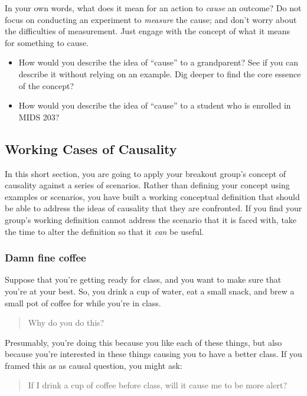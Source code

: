 \documentclass[
]{article}
\providecommand{\tightlist}{%
  \setlength{\itemsep}{0pt}\setlength{\parskip}{0pt}}
\theoremstyle{definition}
\theoremstyle{definition}
\theoremstyle{definition}
\theoremstyle{definition}
\theoremstyle{remark}
\begin{document}
In your own words, what does it mean for an action to \emph{cause} an outcome? Do not focus on conducting an experiment to \emph{measure} the cause; and don't worry about the difficulties of measurement. Just engage with the concept of what it means for something to cause.

\begin{itemize}
\tightlist
\item
  How would you describe the idea of ``cause'' to a grandparent? See if you can describe it without relying on an example. Dig deeper to find the core essence of the concept?
\item
  How would you describe the idea of ``cause'' to a student who is enrolled in MIDS 203?
\end{itemize}

\subsection{Working Cases of Causality}\label{working-cases-of-causality}

In this short section, you are going to apply your breakout group's concept of causality against a series of scenarios. Rather than defining your concept using examples or scenarios, you have built a working conceptual definition that should be able to address the ideas of causality that they are confronted. If you find your group's working definition cannot address the scenario that it is faced with, take the time to alter the definition so that it \emph{can} be useful.

\subsubsection{Damn fine coffee}\label{damn-fine-coffee}

Suppose that you're getting ready for class, and you want to make sure that you're at your best. So, you drink a cup of water, eat a small snack, and brew a small pot of coffee for while you're in class.

\begin{quote}
Why do you do this?
\end{quote}

Presumably, you're doing this because you like each of these things, but also because you're interested in these things causing you to have a better class. If you framed this as as causal question, you might ask:

\begin{quote}
If I drink a cup of coffee before class, will it cause me to be more alert?
\end{quote}
\end{document}
